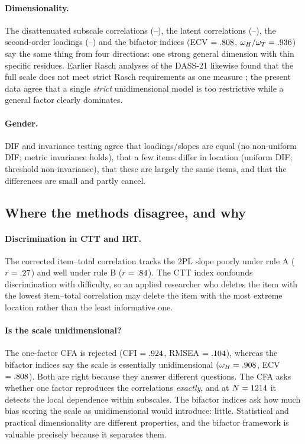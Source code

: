 \documentclass[11pt,a4paper]{article}
\begin{document}
\paragraph{Dimensionality.} The disattenuated subscale correlations (\rDisAD--\rDisDS),
the latent correlations (\PhiDA--\PhiDS), the second-order loadings
(\SecondOrderAnx--\SecondOrderStr) and the bifactor indices (ECV $=.808$,
$\omega_H/\omega_T=.936$) say the same thing from four directions: one strong
general dimension with thin specific residues. Earlier Rasch analyses of the
DASS-21 likewise found that the full scale does not meet strict Rasch requirements as one
measure \citep{shea2009rasch}; the present data agree that a single \emph{strict}
unidimensional model is too restrictive while a general factor clearly dominates.

\paragraph{Gender.} DIF and invariance testing agree that loadings/slopes are equal
(no non-uniform DIF; metric invariance holds), that a few items differ in location
(uniform DIF; threshold non-invariance), that these are largely the same items, and that
the differences are small and partly cancel.

\subsection{Where the methods disagree, and why}

\paragraph{Discrimination in CTT and IRT.} The corrected item--total correlation tracks
the 2PL slope poorly under rule A ($r=.27$) and well under rule B
($r=.84$). The CTT index confounds discrimination with difficulty, so an applied
researcher who deletes the item with the lowest item--total correlation may delete the
item with the most extreme location rather than the least informative one.

\paragraph{Is the scale unidimensional?} The one-factor CFA is rejected (CFI $=.924$,
RMSEA $=.104$), whereas the bifactor indices say the scale is essentially
unidimensional ($\omega_H=.908$, ECV $=.808$). Both are right because they answer
different questions. The CFA asks whether one factor reproduces the correlations
\emph{exactly}, and at $N=1214$ it detects the local dependence within subscales.
The bifactor indices ask how much bias scoring the scale as unidimensional would
introduce: little. Statistical and practical dimensionality are different properties, and
the bifactor framework is valuable precisely because it separates them.
\end{document}
